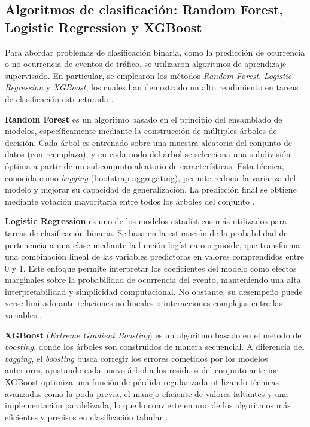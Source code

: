 \documentclass[12pt]{article}
\begin{document}
\subsection{Algoritmos de clasificación: Random Forest, Logistic Regression y XGBoost}

Para abordar problemas de clasificación binaria, como la predicción de ocurrencia o no ocurrencia de eventos de tráfico, se utilizaron algoritmos de aprendizaje supervisado. En particular, se emplearon los métodos \textit{Random Forest}, \textit{Logistic Regression} y \textit{XGBoost}, los cuales han demostrado un alto rendimiento en tareas de clasificación estructurada \parencite{friedman2001elements, chen2016xgboost, hosmer2013applied}.

\textbf{Random Forest} es un algoritmo basado en el principio del ensamblado de modelos, específicamente mediante la construcción de múltiples árboles de decisión. Cada árbol es entrenado sobre una muestra aleatoria del conjunto de datos (con reemplazo), y en cada nodo del árbol se selecciona una subdivisión óptima a partir de un subconjunto aleatorio de características. Esta técnica, conocida como \textit{bagging} (bootstrap aggregating), permite reducir la varianza del modelo y mejorar su capacidad de generalización. La predicción final se obtiene mediante votación mayoritaria entre todos los árboles del conjunto \parencite{breiman2001random}.

\textbf{Logistic Regression} es uno de los modelos estadísticos más utilizados para tareas de clasificación binaria. Se basa en la estimación de la probabilidad de pertenencia a una clase mediante la función logística o sigmoide, que transforma una combinación lineal de las variables predictoras en valores comprendidos entre 0 y 1. Este enfoque permite interpretar los coeficientes del modelo como efectos marginales sobre la probabilidad de ocurrencia del evento, manteniendo una alta interpretabilidad y simplicidad computacional. No obstante, su desempeño puede verse limitado ante relaciones no lineales o interacciones complejas entre las variables \parencite{hosmer2013applied}.

\textbf{XGBoost} (\textit{Extreme Gradient Boosting}) es un algoritmo basado en el método de \textit{boosting}, donde los árboles son construidos de manera secuencial. A diferencia del \textit{bagging}, el \textit{boosting} busca corregir los errores cometidos por los modelos anteriores, ajustando cada nuevo árbol a los residuos del conjunto anterior. XGBoost optimiza una función de pérdida regularizada utilizando técnicas avanzadas como la poda previa, el manejo eficiente de valores faltantes y una implementación paralelizada, lo que lo convierte en uno de los algoritmos más eficientes y precisos en clasificación tabular \parencite{chen2016xgboost}.
\end{document}
